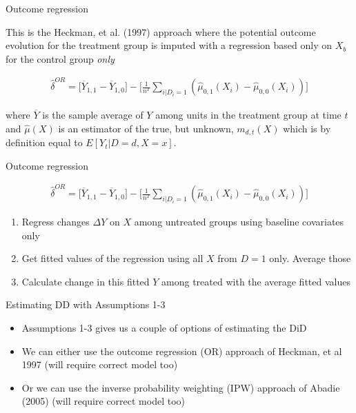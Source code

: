 \documentclass{beamer}
\begin{document}
\begin{frame}{Outcome regression}

This is the Heckman, et al. (1997) approach where the potential outcome evolution for the treatment group is imputed with a regression based only on $X_b$ for the control group \emph{only}

\bigskip

\begin{eqnarray*}
\widehat{\delta}^{OR} = \bigg [ \overline{Y}_{1,1} -  \overline{Y}_{1,0} \bigg ] -  \bigg [ \frac{1}{n^T} \sum_{i|D_i=1} ( \widehat{\mu}_{0,1}(X_i) - \widehat{\mu}_{0,0}(X_i)) \bigg ]
\end{eqnarray*}

where $\overline{Y}$ is the sample average of $Y$ among units in the treatment group at time $t$ and $\widehat{\mu}(X)$ is an estimator of the true, but unknown, $m_{d,t}(X)$ which is by definition equal to $E[Y_t|D=d,X=x]$.

\end{frame}




\begin{frame}{Outcome regression}

\begin{eqnarray*}
\widehat{\delta}^{OR} = \bigg [ \overline{Y}_{1,1} -  \overline{Y}_{1,0} \bigg ] -  \bigg [ \frac{1}{n^T} \sum_{i|D_i=1} ( \widehat{\mu}_{0,1}(X_i) - \widehat{\mu}_{0,0}(X_i)) \bigg ]
\end{eqnarray*}

\begin{enumerate}
\item Regress changes $\Delta Y$ on $X$ among untreated groups using baseline covariates only
\item Get fitted values of the regression using all $X$ from $D=1$ only.  Average those
\item Calculate change in this fitted $Y$ among treated with the average fitted values
\end{enumerate}

\end{frame}

\begin{frame}{Estimating DD with Assumptions 1-3}

\begin{itemize}
\item Assumptions 1-3 gives us a couple of options of estimating the DiD
\item We can either use the outcome regression (OR) approach of Heckman, et al 1997 (will require correct model too)
\item Or we can use the inverse probability weighting (IPW) approach of Abadie (2005) (will require correct model too)
\end{itemize}

\end{frame}
\end{document}
